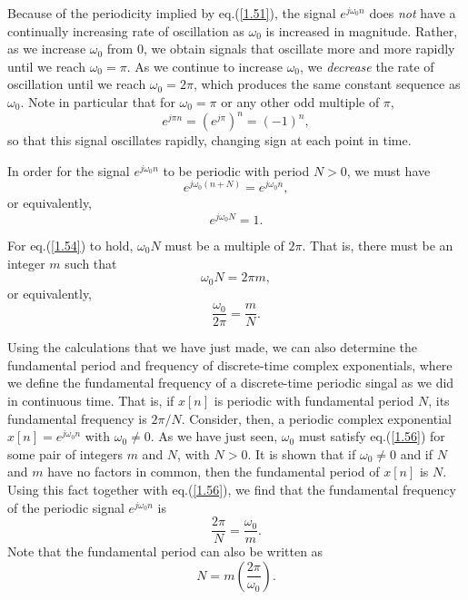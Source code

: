 \documentclass[a4paper,twoside]{book}
\begin{document}
Because of the periodicity implied by eq.\;(\ref{1.51}), the signal $e^{j\omega_0n}$ does \textit{not} have a continually increasing rate of oscillation as $\omega_0$ is increased in magnitude. Rather, as we increase $\omega_0$ from 0, we obtain signals that oscillate more and more rapidly until we reach $\omega_0=\pi$. As we continue to increase $\omega_0$, we \textit{decrease} the rate of oscillation until we reach $\omega_0=2\pi$, which produces the same constant sequence as $\omega_0$. Note in particular that for $\omega_0=\pi$ or any other odd multiple of $\pi$,
\begin{equation}
    e^{j\pi n} = \left(e^{j\pi}\right)^{n} = (-1)^{n},
    \label{1.52}
\end{equation}
so that this signal oscillates rapidly, changing sign at each point in time.

In order for the signal $e^{j\omega_0n}$ to be periodic with period $N>0$, we must have
\begin{equation}
    e^{j\omega_0(n+N)}=e^{j\omega_0n},
    \label{1.53}
\end{equation}
or equivalently,
\begin{equation}
    e^{j\omega_0N}=1.
    \label{1.54}
\end{equation}

For eq.\;(\ref{1.54}) to hold, $\omega_0N$ must be a multiple of $2\pi$. That is, there must be an integer $m$ such that
\begin{equation}
    \omega_0N=2\pi m,
    \label{1.55}
\end{equation}
or equivalently,
\begin{equation}
    \dfrac{\omega_0}{2\pi}=\dfrac{m}{N}.
    \label{1.56}
\end{equation}

Using the calculations that we have just made, we can also determine the fundamental period and frequency of discrete-time complex exponentials, where we define the fundamental frequency of a discrete-time periodic singal as we did in continuous time. That is, if $x[n]$ is periodic with fundamental period $N$, its fundamental frequency is $2\pi/N$. Consider, then, a periodic complex exponential $x[n]=e^{j\omega_0n}$ with $\omega_0\ne 0$. As we have just seen, $\omega_0$ must satisfy eq.\;(\ref{1.56}) for some pair of integers $m$ and $N$, with $N>0$. It is shown that if $\omega_0\ne 0$ and if $N$ and $m$ have no factors in common, then the fundamental period of $x[n]$ is $N$. Using this fact together with eq.\;(\ref{1.56}), we find that the fundamental frequency of the periodic signal $e^{j\omega_0n}$ is
\begin{equation}
    \frac{2\pi}N=\frac{\omega_0}m.
    \label{1.57}
\end{equation}
Note that the fundamental period can also be written as
\begin{equation}
    N = m\left(\frac{2\pi}{\omega_0}\right).
    \label{1.58}
\end{equation}
\end{document}
